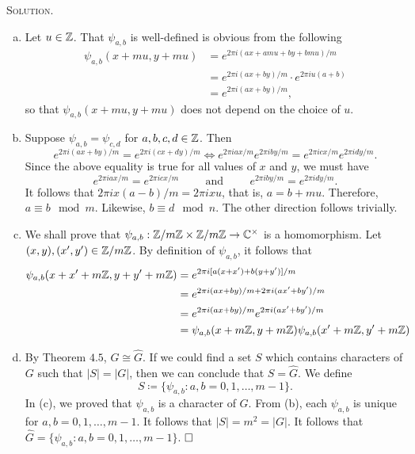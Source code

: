 \documentclass[11pt, leqno]{article}
\newcommand{\done}{\ensuremath{\hfill\square}}
\begin{document}
\textsc{Solution}.
\begin{enumerate}[(a)]
\item Let $u \in \mathbb{Z}$. That $\psi_{a,b}$ is well-defined is obvious from the following 
\begin{align*}
  \psi_{a,b}(x+mu, y + mu) &= e^{2\pi i (ax + amu + by + bmu)/m} \\
                           &= e^{2\pi i(ax+by)/m}\cdot e^{2\pi iu(a+b)} \\
                           &= e^{2\pi i(ax+by)/m},
\end{align*}
so that $\psi_{a,b}(x+mu, y+mu)$ does not depend on the choice of $u$. 
\item Suppose $\psi_{a,b} = \psi_{c,d}$ for $a, b, c, d \in \mathbb{Z}$. Then
\begin{displaymath}
e^{2\pi i (ax+by)/m} = e^{2\pi i (cx+dy)/m} \iff e^{2\pi i ax/m} e^{2\pi i by/m} = e^{2\pi i cx/m} e^{2\pi i dy/m}.
\end{displaymath}
Since the above equality is true for all values of $x$ and $y$, we must have 
\begin{displaymath}
e^{2\pi i ax/m} = e^{2\pi i cx/m} \hspace{1cm} \text{and} \hspace{1cm} e^{2\pi i by/m} = e^{2\pi i dy/m}.
\end{displaymath}
It follows that $2\pi i x (a-b)/m = 2\pi i x u$, that is, $a = b + mu$. Therefore, $a \equiv b \mod m$. Likewise, $b \equiv d \mod n$. The other direction follows trivially. 
\item We shall prove that $\psi_{a,b}: \mathbb{Z}/m\mathbb{Z} \times \mathbb{Z}/m\mathbb{Z} \to \mathbb{C}^{\times}$ is a homomorphism. Let $(x, y), (x^{\prime}, y^{\prime}) \in \mathbb{Z}/m\mathbb{Z}$. By definition of $\psi_{a,b}$, it follows that 
\begin{align*}
  \psi_{a,b}(x+ x^{\prime} + m\mathbb{Z}, y + y^{\prime} + m\mathbb{Z}) &= e^{2\pi i [a(x+x^{\prime}) + b(y+y^{\prime})]/m} \\
                                                        &= e^{2\pi i (ax+by)/m + 2\pi i (ax^{\prime}+by^{\prime})/m} \\
                                                        &= e^{2\pi i (ax+by)/m} e^{2\pi i (ax^{\prime} + by^{\prime})/m} \\
  &= \psi_{a,b}(x + m\mathbb{Z}, y + m\mathbb{Z}) \psi_{a,b} (x^{\prime} + m\mathbb{Z}, y^{\prime} + m\mathbb{Z})
\end{align*} 
\item By Theorem $4.5$, $G \cong \widehat{G}$. If we could find a set $S$ which contains characters of $G$ such that $|S|=|G|$, then we can conclude that $S = \widehat G$. We define 
\begin{displaymath}
S \coloneqq \{ \psi_{a,b} : a, b = 0,1,\ldots, m-1\}.
\end{displaymath}
In (c), we proved that $\psi_{a,b}$ is a character of $G$. From (b), each $\psi_{a,b}$ is unique for $a, b = 0,1,\ldots, m-1$. It follows that $|S|=m^2 = |G|$. It follows that $\widehat{G} = \{ \psi_{a,b}: a,b = 0, 1,\ldots, m-1 \}$. \done
\end{enumerate}
\end{document}
